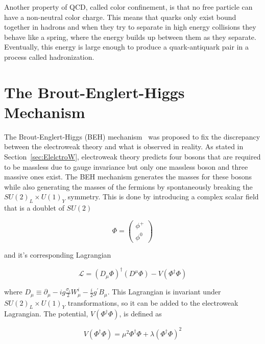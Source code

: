 Another property of QCD, called color confinement, is that no free particle can have a non-neutral color charge. This means that quarks only exist bound together in hadrons and when they try to separate in high energy collisions they behave like a spring, where the energy builds up between them as they separate. Eventually, this energy is large enough to produce a quark-antiquark pair in a process called hadronization. 


\section{The Brout-Englert-Higgs Mechanism}
\label{sec:BEHmechanism}

The Brout-Englert-Higgs (BEH) mechanism~\cite{BEmechanism,Hmechanism} was proposed to fix the discrepancy between the electroweak theory and what is observed in reality. As stated in Section~\ref{sec:ElelctroW}, electroweak theory predicts four bosons that are required to be massless due to gauge invariance but only one massless boson and three massive ones exist. The BEH mechanism generates the masses for these bosons while also generating the masses of the fermions by spontaneously breaking the $SU(2)_{L}\times U(1)_{Y}$ symmetry. This is done by introducing a complex scalar field that is a doublet of $SU(2)$

\begin{equation}
\Phi = 
\begin{pmatrix}
\phi^{+}\\
\phi^{0}
\end{pmatrix}
\end{equation}

\noindent
and it's corresponding Lagrangian

\begin{equation}
\label{eq:HiggsLag}
\mathcal{L} = (D_{\mu}\Phi)^{\dag}(D^{\mu}\Phi) - V(\Phi^{\dag}\Phi)
\end{equation}

\noindent
where $D_{\mu}\equiv \partial_{\mu} - ig\frac{\sigma_{i}}{2}W^{i}_{\mu} - \frac{i}{2}g^{\prime}B_{\mu}$. This Lagrangian is invariant under $SU(2)_{L}\times U(1)_{Y}$ transformations, so it can be added to the electroweak Lagrangian. The potential, $V(\Phi^{\dag}\Phi)$, is defined as

\begin{equation}
V(\Phi^{\dag}\Phi)=\mu^{2}\Phi^{\dag}\Phi+\lambda(\Phi^{\dag}\Phi)^{2}
\end{equation}

